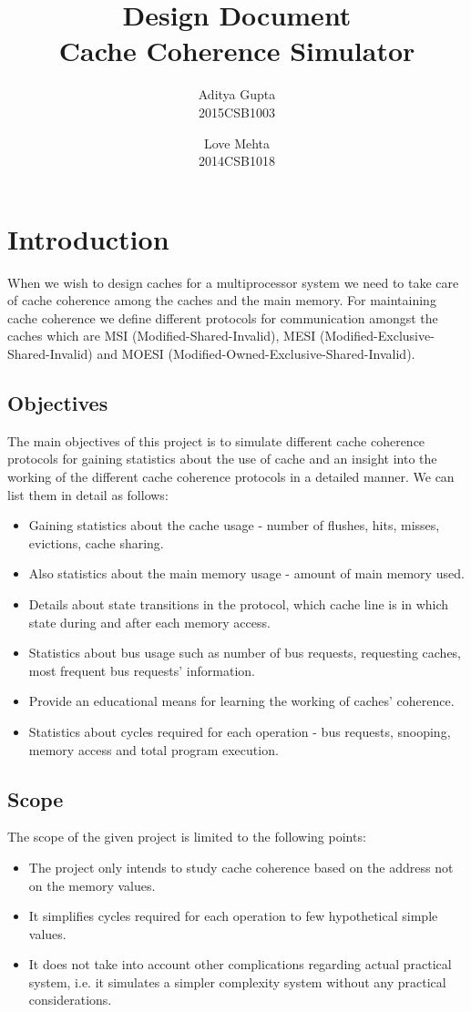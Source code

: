 \documentclass{article}
\title{Design Document\\Cache Coherence Simulator}
\author{Aditya Gupta\\2015CSB1003 \and Love Mehta\\2014CSB1018}
\date{}
\begin{document}
\maketitle
\section{Introduction}
When we wish to design caches for a multiprocessor system we need to take care of cache coherence among the caches and the main memory. For maintaining cache coherence we define different protocols for communication amongst the caches which are MSI (Modified-Shared-Invalid), MESI (Modified-Exclusive-Shared-Invalid) and MOESI (Modified-Owned-Exclusive-Shared-Invalid).
\subsection{Objectives}
The main objectives of this project is to simulate different cache coherence protocols for gaining statistics about the use of cache and an insight into the working of the different cache coherence protocols in a detailed manner. We can list them in detail as follows:
\begin{itemize}
\item Gaining statistics about the cache usage - number of flushes, hits, misses, evictions, cache sharing.
\item Also statistics about the main memory usage - amount of main memory used.
\item Details about state transitions in the protocol, which cache line is in which state during and after each memory access.
\item Statistics about bus usage such as number of bus requests, requesting caches, most frequent bus  requests' information.
\item Provide an educational means for learning the working of caches' coherence.
\item Statistics about cycles required for each operation - bus requests, snooping, memory access and total program execution.
\end{itemize}
\subsection{Scope}
The scope of the given project is limited to the following points:
\begin{itemize}
\item The project only intends to study cache coherence based on the address not on the memory values.
\item It simplifies cycles required for each operation to few hypothetical simple values.
\item It does not take into account other complications regarding actual practical system, i.e. it simulates a simpler complexity system without any practical considerations.
\end{itemize}
\end{document}
